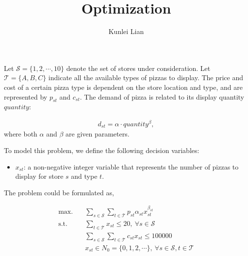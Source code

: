 \documentclass[a4, 11pt]{article}
\begin{document}
\title{Optimization}
\author{Kunlei Lian}
\maketitle

Let $\mathcal{S} = \{1, 2, \cdots, 10\}$ denote the set of stores under consideration.
Let $\mathcal{T} = \{A, B, C\}$ indicate all the available types of pizzas to display.
The price and cost of a certain pizza type is dependent on the store location and type, and are represented by $p_{st}$ and $c_{st}$.
The demand of pizza is related to its display quantity $quantity$:

\begin{align}
	d_{st} = \alpha \cdot quantity^{\beta},
\end{align} 
where both $\alpha$ and $\beta$ are given parameters.

To model this problem, we define the following decision variables:

\begin{itemize}
	\item $x_{st}$: a non-negative integer variable that represents the number of pizzas to display for store $s$ and type $t$.
\end{itemize}

The problem could be formulated as,

\begin{align}
	\text{max.} &\quad \sum_{s \in \mathcal{S}} \sum_{t \in \mathcal{T}} p_{st} \alpha_{st} x_{st}^{\beta_{st}} \label{obj} \\
	\text{s.t.} &\quad  \sum_{t \in \mathcal{T}} x_{st} \leq 20, \ \forall s \in \mathcal{S} \label{cons1} \\
	&\quad \sum_{s \in \mathcal{S}} \sum_{t \in \mathcal{T}} c_{st} x_{st} \leq 100000 \label{cons2} \\
	&\quad x_{st} \in N_0 = \{0, 1, 2, \cdots\}, \ \forall s \in \mathcal{S}, t \in \mathcal{T}
\end{align}

	
\end{document}
